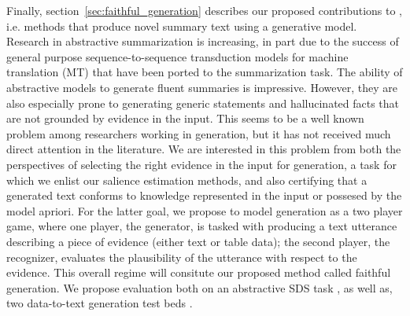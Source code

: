 Finally, section~\ref{sec:faithful_generation} describes our proposed 
contributions to
, i.e. methods that produce novel 
summary text using a generative model. 
Research in abstractive summarization is increasing, in part due to
the success of general purpose sequence-to-sequence transduction models 
for machine translation (MT) that have been ported to the summarization task.
The ability of abstractive models to generate fluent 
summaries is impressive. However, they are also especially prone 
to generating generic statements and hallucinated facts that are not grounded 
by evidence in the input. This seems to be a well known problem among 
researchers working
in generation, but it has not received much direct attention in the literature.
We are interested in this problem from both the perspectives of selecting
the right evidence in the input for generation, a task for which we enlist
our salience estimation methods, and also certifying that a generated text
conforms to knowledge represented in the input or possesed by the model
apriori. For the latter goal, we propose to model generation as a two player
game, where one player, the generator, is tasked with producing a text
utterance describing a piece of evidence (either text or table data);
the second player, the recognizer, %
evaluates the plausibility of the utterance with respect to the evidence.
This overall regime will consitute our proposed method called
 faithful generation.
We propose 
evaluation both on an abstractive SDS task \citep{volske2017tl}, 
as well as, two data-to-text generation 
test beds \citep{lebret2016neural,novikova2017e2e}.





